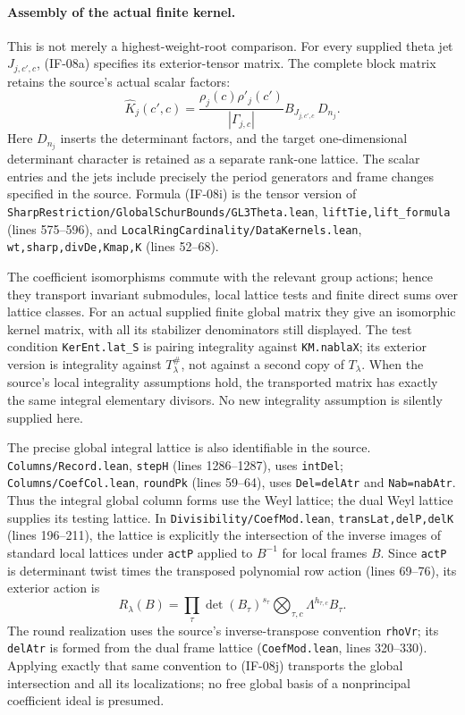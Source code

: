 \paragraph{Assembly of the actual finite kernel.}
This is not merely a highest-weight-root comparison. For every
supplied theta jet $J_{j,c',c}$, (IF-08a) specifies its exterior-tensor
matrix. The complete block matrix retains the source's actual scalar
factors:
\[
 \widehat K_j(c',c)=\frac{\rho_j(c)\rho'_j(c')}{|\Gamma_{j,c}|}
        B_{J_{j,c',c}}\,D_{n_j}.                  \tag{IF-08i}
\]
Here $D_{n_j}$ inserts the determinant factors, and the target
one-dimensional determinant character is retained as a separate
rank-one lattice. The scalar entries and the jets include precisely
the period generators and frame changes specified in the source.
Formula (IF-08i) is the tensor version of
\texttt{SharpRestriction/GlobalSchurBounds/GL3Theta.lean},
\texttt{liftTie,lift\_formula} (lines 575--596), and
\texttt{LocalRingCardinality/DataKernels.lean},
\texttt{wt,sharp,divDe,Kmap,K} (lines 52--68).

The coefficient isomorphisms commute with the relevant group actions;
hence they transport invariant submodules, local lattice tests and
finite direct sums over lattice classes. For an actual supplied
finite global matrix they give an isomorphic kernel matrix, with all
its stabilizer denominators still displayed. The test condition
\texttt{KerEnt.lat\_S} is pairing integrality against
\texttt{KM.nablaX}; its exterior version is integrality against
$T_\lambda^\#$, not against a second copy of $T_\lambda$.
When the source's local integrality assumptions hold, the transported
matrix has exactly the same integral elementary divisors. No new
integrality assumption is silently supplied here.

The precise global integral lattice is also identifiable in the source.
\texttt{Columns/Record.lean}, \texttt{stepH} (lines 1286--1287),
uses \texttt{intDel}; \texttt{Columns/CoefCol.lean},
\texttt{roundPk} (lines 59--64), uses \texttt{Del=delAtr} and
\texttt{Nab=nabAtr}. Thus the integral global column forms use the
Weyl lattice; the dual Weyl lattice supplies its testing lattice.
In \texttt{Divisibility/CoefMod.lean},
\texttt{transLat,delP,delK} (lines 196--211), the lattice is explicitly
the intersection of the inverse images of standard local lattices
under \texttt{actP} applied to $B^{-1}$ for local frames $B$.
Since \texttt{actP} is determinant twist times the transposed
polynomial row action (lines 69--76), its exterior action is
\[
 R_\lambda(B)=\prod_\tau\det(B_\tau)^{s_\tau}
       \bigotimes_{\tau,c}\Lambda^{h_{\tau,c}}B_\tau.
                                                               \tag{IF-08j}
\]
The round realization uses the source's inverse-transpose convention
\texttt{rhoVr}; its \texttt{delAtr} is formed from the dual frame
lattice (\texttt{CoefMod.lean}, lines 320--330). Applying exactly that
same convention to (IF-08j) transports the global intersection and
all its localizations; no free global basis of a nonprincipal
coefficient ideal is presumed.

